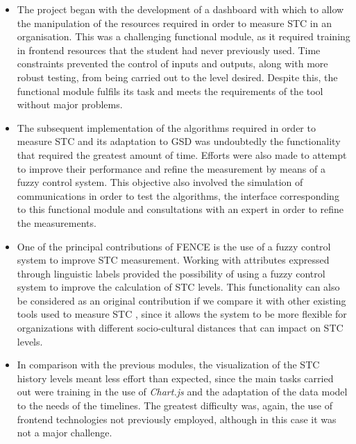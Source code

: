 \begin{itemize}
\item The project began with the development of a dashboard with which to allow the manipulation of the resources required in order to measure STC in an organisation. This was a challenging functional module, as it required training in frontend resources that the student had never previously used. Time constraints prevented the control of inputs and outputs, along with more robust testing, from being carried out to the level desired. Despite this, the functional module fulfils its task and meets the requirements of the tool without major problems.\newline

\item The subsequent implementation of the algorithms required in order to measure STC and its adaptation to GSD was undoubtedly the functionality that required the greatest amount of time. Efforts were also made to attempt to improve their performance and refine the measurement by means of a fuzzy control system. This objective also involved the simulation of communications in order to test the algorithms, the interface corresponding to this functional module and consultations with an expert in order to refine the measurements.\newline

\item One of the principal contributions of FENCE is the use of a fuzzy control system to improve STC measurement. Working with attributes expressed through linguistic labels provided the possibility of using a fuzzy control system to improve the calculation of STC levels. This functionality can also be considered as an original contribution if we compare it with other existing tools used to measure STC \cite{sierra_systematic_2018}, since it allows the system to be more flexible for organizations with different socio-cultural distances that can impact on STC levels.\newline

\item In comparison with the previous modules, the visualization of the STC history levels meant less effort than expected, since the main tasks carried out were training in the use of \emph{Chart.js} and the adaptation of the data model to the needs of the timelines. The greatest difficulty was, again, the use of frontend technologies not previously employed, although in this case it was not a major challenge.\newline


\end{itemize}
